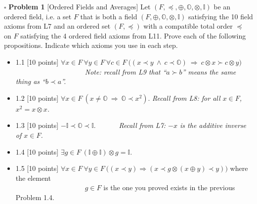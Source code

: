 \documentclass[11pt]{article}
\numberwithin{equation}{section}
\DeclareMathOperator*{\+}{\oplus}
\begin{document}
   \noindent $\square$ \textbf{Problem 1}  [\textsf{Ordered Fields and Averages}] Let $(F, \preccurlyeq,  \oplus , \mathbb{O}, \otimes, \mathbb{I})$ be an ordered field, i.e. a set $F$ that is both a field $(F, \oplus, \mathbb{O}, \otimes, \mathbb{I})$ satisfying the 10 field axioms from \textsf{L7} and an ordered set $(F, \preccurlyeq)$ with a compatible total order $\preccurlyeq$ on $F$ satisfying the 4 ordered field axioms from \textsf{L11}. Prove each of the following propositions.  Indicate which axioms you use in each step.
   \begin{itemize}
  \itemsep0em 
   \item 1.1 [10 points] $\forall x \in F \ \forall y \in F \ \forall c  \in F \ \Big ( (x \prec y \ \land \ c \prec \mathbb{O}) \ \Rightarrow \ c \otimes x \succ c \otimes y \Big ) $\\
   \indent \ \ \ \ \  \ \ \ \ \ \ \ \  \ \ \ \ \ \ \ \textit{Note: recall from \textnormal{\textsf{L9}} that ``$a \succ b$'' means the same thing as ``$b \prec a$''.}
   \item 1.2 [10 points] $\forall x \in F \ (x \neq \mathbb{O} \ \Rightarrow \ \mathbb{O} \prec x^2 )$.  \textit{Recall from \textnormal{\textsf{L8}}: for all $x \in F$, $x^2 = x \otimes x$.}
 \item 1.3 [10 points] $- \mathbb{I} \prec \mathbb{O} \prec \mathbb{I}$.  \ \ \ \ \ \ \textit{Recall from \textnormal{\textsf{L7}}: $-x$ is the additive inverse of $x \in F$.}
      \item 1.4 [10 points] $\exists g \in F \ (\mathbb{I} \oplus \mathbb{I} ) \otimes g = \mathbb{I}$.
   \item 1.5 [10 points] $\forall x \in F \ \forall y \in F \ \Big ( (x \prec y) \Rightarrow (x \prec g \otimes ({x \oplus y}) \prec y) \Big )$ where the element\\    \indent \ \ \ \ \  \ \ \ \ \ \ \ \  \ \ \ \ \ \ \  $g \in F$ is the one you proved exists in the previous Problem 1.4.
   \end{itemize}
\end{document}
